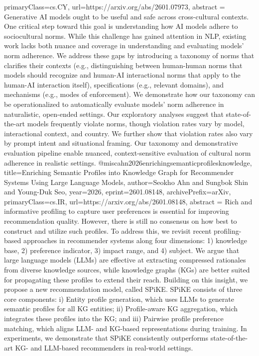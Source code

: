 {      primaryClass={cs.CY},
      url={https://arxiv.org/abs/2601.07973},
      abstract = {Generative AI models ought to be useful and safe across cross-cultural contexts. One critical step toward this goal is understanding how AI models adhere to sociocultural norms. While this challenge has gained attention in NLP, existing work lacks both nuance and coverage in understanding and evaluating models' norm adherence. We address these gaps by introducing a taxonomy of norms that clarifies their contexts (e.g., distinguishing between human-human norms that models should recognize and human-AI interactional norms that apply to the human-AI interaction itself), specifications (e.g., relevant domains), and mechanisms (e.g., modes of enforcement). We demonstrate how our taxonomy can be operationalized to automatically evaluate models' norm adherence in naturalistic, open-ended settings. Our exploratory analyses suggest that state-of-the-art models frequently violate norms, though violation rates vary by model, interactional context, and country. We further show that violation rates also vary by prompt intent and situational framing. Our taxonomy and demonstrative evaluation pipeline enable nuanced, context-sensitive evaluation of cultural norm adherence in realistic settings.}
}@misc{ahn2026enrichingsemanticprofilesknowledge,
      title={Enriching Semantic Profiles into Knowledge Graph for Recommender Systems Using Large Language Models}, 
      author={Seokho Ahn and Sungbok Shin and Young-Duk Seo},
      year={2026},
      eprint={2601.08148},
      archivePrefix={arXiv},
      primaryClass={cs.IR},
      url={https://arxiv.org/abs/2601.08148},
      abstract = {Rich and informative profiling to capture user preferences is essential for improving recommendation quality. However, there is still no consensus on how best to construct and utilize such profiles. To address this, we revisit recent profiling-based approaches in recommender systems along four dimensions: 1) knowledge base, 2) preference indicator, 3) impact range, and 4) subject. We argue that large language models (LLMs) are effective at extracting compressed rationales from diverse knowledge sources, while knowledge graphs (KGs) are better suited for propagating these profiles to extend their reach. Building on this insight, we propose a new recommendation model, called SPiKE. SPiKE consists of three core components: i) Entity profile generation, which uses LLMs to generate semantic profiles for all KG entities; ii) Profile-aware KG aggregation, which integrates these profiles into the KG; and iii) Pairwise profile preference matching, which aligns LLM- and KG-based representations during training. In experiments, we demonstrate that SPiKE consistently outperforms state-of-the-art KG- and LLM-based recommenders in real-world settings.}
}

